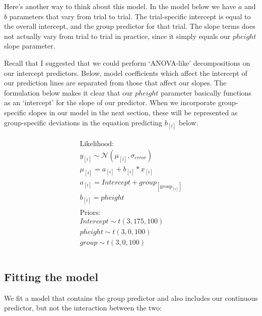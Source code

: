 \documentclass[
]{book}
\begin{document}
Here's another way to think about this model. In the model below we have \(a\) and \(b\) parameters that vary from trial to trial. The trial-specific intercept is equal to the overall intercept, and the group predictor for that trial. The slope terms does not actually vary from trial to trial in practice, since it simply equals our \(pheight\) slope parameter.

Recall that I suggested that we could perform `ANOVA-like' decompositions on our intercept predictors. Below, model coefficients which affect the intercept of our prediction lines are separated from those that affect our slopes. The formulation below makes it clear that our \(pheight\) parameter basically functions as an `intercept' for the slope of our predictor. When we incorporate group-specific slopes in our model in the next section, these will be represented as group-specific deviations in the equation predicting \(b_{[i]}\) below.

\begin{equation}
\begin{split}
\\
\textrm{Likelihood:} \\
y_{[i]} \sim \mathcal{N}(\mu_{[i]},\sigma_{error}) \\
\mu_{[i]} = a_{[i]} + b_{[i]} * x_{[i]}  \\ 
a_{[i]} = Intercept + group_{[\mathrm{group}_{[i]}]} \\
b_{[i]} = pheight \\ \\
\textrm{Priors:} \\
Intercept \sim t(3, 175, 100) \\
pheight \sim t(3, 0, 100) \\ 
group \sim t(3, 0, 100) \\ 
\\
\end{split}
\label{eq:511}
\end{equation}

\hypertarget{fitting-the-model-4}{%
\subsection{Fitting the model}\label{fitting-the-model-4}}

We fit a model that contains the group predictor and also includes our continuous predictor, but not the interaction between the two:
\end{document}
